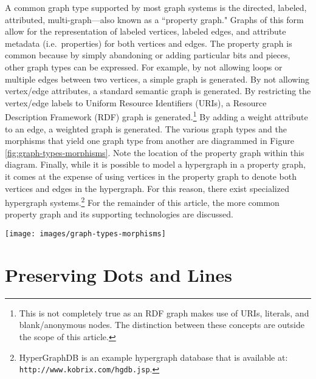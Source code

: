 \documentclass{svmult}
\newcommand{\ttt}{\texttt}
\begin{document}
A common graph type supported by most graph systems is the directed, labeled, attributed, multi-graph---also known as a ``property graph." Graphs of this form allow for the representation of labeled vertices, labeled edges, and attribute metadata (i.e.~properties) for both vertices and edges. The property graph is common because by simply abandoning or adding particular bits and pieces, other graph types can be expressed. For example, by not allowing loops or multiple edges between two vertices, a simple graph is generated. By not allowing vertex/edge attributes, a standard semantic graph is generated. By restricting the vertex/edge labels to Uniform Resource Identifiers (URIs), a Resource Description Framework (RDF) graph is generated.\footnote{This is not completely true as an RDF graph makes use of URIs, literals, and blank/anonymous nodes. The distinction between these concepts are outside the scope of this article.}  By adding a weight attribute to an edge, a weighted graph is generated. The various graph types and the morphisms that yield one graph type from another are diagrammed in Figure \ref{fig:graph-types-morphisms}. Note the location of the property graph within this diagram. Finally, while it is possible to model a hypergraph in a property graph, it comes at the expense of using vertices in the property graph to denote both vertices and edges in the hypergraph. For this reason, there exist specialized hypergraph systems.\footnote{HyperGraphDB is an example hypergraph database that is available at: \ttt{http://www.kobrix.com/hgdb.jsp}.} For the remainder of this article, the more common property graph and its supporting technologies are discussed.
\begin{figure*}[h!]
	\centering
		\texttt{[image: images/graph-types-morphisms]}
	\caption{\label{fig:graph-types-morphisms}The property graph is a convenient structure because it contains most of the bits and pieces used in graph modeling. Simple morphisms of the the property graph yield other common graph structures. Thus, graph systems that support the property graph data model also, implicitly support other graph types.}
\end{figure*}

\section{Preserving Dots and Lines}
\end{document}
